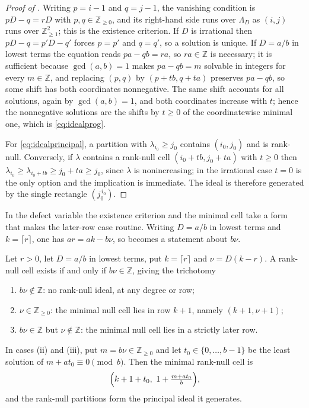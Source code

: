 \documentclass[11pt,letterpaper]{article}
\newcommand{\Zint}{\mathbb{Z}}
\begin{document}
\begin{proof}[Proof of ]
Writing $p=i-1$ and $q=j-1$, the vanishing condition is $pD-q=rD$ with
$p,q\in\Zint_{\ge0}$, and its right-hand side runs over $\Lambda_D$ as $(i,j)$
runs over $\Zint_{\ge1}^{2}$; this is the existence criterion. If $D$ is
irrational then $pD-q=p'D-q'$ forces $p=p'$ and $q=q'$, so a solution is unique.
If $D=a/b$ in lowest terms the equation reads $pa-qb=ra$, so $ra\in\Zint$ is
necessary; it is sufficient because $\gcd(a,b)=1$ makes $pa-qb=m$ solvable in
integers for every $m\in\Zint$, and replacing $(p,q)$ by $(p+tb,q+ta)$ preserves
$pa-qb$, so some shift has both coordinates nonnegative. The same shift accounts
for all solutions, again by $\gcd(a,b)=1$, and both coordinates increase with
$t$; hence the nonnegative solutions are the shifts by $t\ge0$ of the
coordinatewise minimal one, which is \eqref{eq:idealprog}.

For \eqref{eq:idealprincipal}, a partition with $\lambda_{i_0}\ge j_0$ contains
$(i_0,j_0)$ and is rank-null. Conversely, if $\lambda$ contains a rank-null cell
$(i_0+tb,j_0+ta)$ with $t\ge0$ then $\lambda_{i_0}\ge\lambda_{i_0+tb}\ge
j_0+ta\ge j_0$, since $\lambda$ is nonincreasing; in the irrational case $t=0$ is
the only option and the implication is immediate. The ideal is therefore
generated by the single rectangle $(j_0^{\,i_0})$.
\end{proof}

In the defect variable the existence criterion and the minimal cell take a form
that makes the later-row case routine. Writing $D=a/b$ in lowest terms and
$k=\lceil r\rceil$, one has $ar=ak-b\nu$, so  becomes a
statement about $b\nu$.

\begin{corollary}
\label{cor:defectideal}
Let $r>0$, let $D=a/b$ in lowest terms, put $k=\lceil r\rceil$ and
$\nu=D(k-r)$. A rank-null cell exists if and only if $b\nu\in\Zint$, giving the
trichotomy
\begin{enumerate}
\item[(i)] $b\nu\notin\Zint$: no rank-null ideal, at any degree or row;
\item[(ii)] $\nu\in\Zint_{\ge0}$: the minimal null cell lies in row
  $k+1$, namely $(k+1,\nu+1)$;
\item[(iii)] $b\nu\in\Zint$ but $\nu\notin\Zint$: the minimal null cell lies in a
  strictly later row.
\end{enumerate}
In cases (ii) and (iii), put $m=b\nu\in\Zint_{\ge0}$ and let
$t_0\in\{0,\dots,b-1\}$ be the least solution of $m+at_0\equiv0\pmod b$. Then the
minimal rank-null cell is
\begin{equation}
  \Bigl(k+1+t_0,\ 1+\tfrac{m+at_0}{b}\Bigr),
  \label{eq:mincell}
\end{equation}
and the rank-null partitions form the principal ideal it generates.
\end{corollary}
\end{document}
